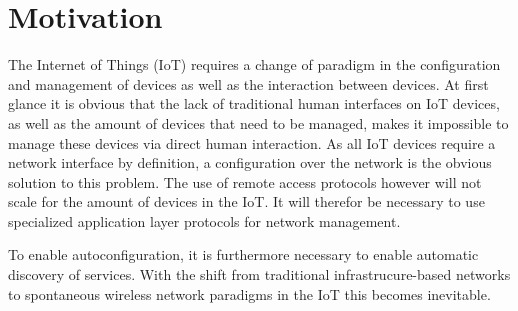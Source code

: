 \documentclass[conference]{IEEEtran}
\begin{document}




%
\IEEEpeerreviewmaketitle



\section{Motivation}



%  
%
%

  The Internet of Things (IoT) requires a change of paradigm in the configuration and management of devices as well as the interaction between devices. At first glance it is obvious that the lack of traditional human interfaces on IoT devices, as well as the amount of devices that need to be managed, makes it impossible to manage these devices via direct human interaction. As all IoT devices require a network interface by definition, a configuration over the network is the obvious solution to this problem. 
  The use of remote access protocols however will not scale for the amount of devices in the IoT. It will therefor be necessary to use specialized application layer protocols for network management. 

  To enable autoconfiguration, it is furthermore necessary to enable automatic discovery of services. With the shift from traditional infrastrucure-based networks to spontaneous wireless network paradigms in the IoT this becomes inevitable.
\end{document}
